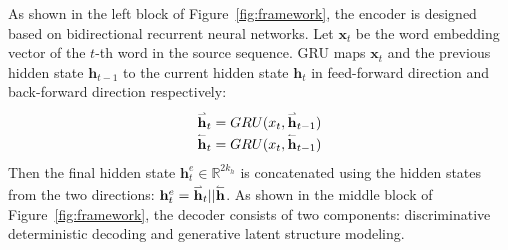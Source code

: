 \documentclass[11pt,letterpaper]{article}
\begin{document}
As shown in the left block of Figure~\ref{fig:framework}, the encoder is designed based on bidirectional recurrent neural networks.
Let $\mathbf{x}_t$ be the word embedding vector of the $t$-th word in the source sequence.
GRU maps $\mathbf{x}_t$ and the previous hidden state $\mathbf{h}_{t-1}$ to the current hidden state $\mathbf{h}_t$ in feed-forward direction and back-forward direction respectively:
\begin{equation}
\begin{array}{l}
{{\mathord{\buildrel{\lower3pt\hbox{$\scriptscriptstyle\rightharpoonup$}} 
			\over {\mathbf{h}}} }_t} = GRU({x_t},{{\mathord{\buildrel{\lower3pt\hbox{$\scriptscriptstyle\rightharpoonup$}} 
			\over {\mathbf{h}}} }_{t - 1}})\\
{{\mathord{\buildrel{\lower3pt\hbox{$\scriptscriptstyle\leftharpoonup$}} 
			\over {\mathbf{h}}} }_t} = GRU({x_t},{{\mathord{\buildrel{\lower3pt\hbox{$\scriptscriptstyle\leftharpoonup$}} 
			\over {\mathbf{h}}} }_{t - 1}})
\end{array}
\end{equation}
Then the final hidden state $\mathbf{h}_t^e \in \mathbb{R}^{2k_h}$ is concatenated using the hidden states from the two directions:
$
{\mathbf{h}}_t^e = {{\mathord{\buildrel{\lower3pt\hbox{$\scriptscriptstyle\rightharpoonup$}} 
			\over {\mathbf{h}}} }_t}||\mathord{\buildrel{\lower3pt\hbox{$\scriptscriptstyle\leftharpoonup$}} 
	\over {\mathbf{h}}} 
$. 
As shown in the middle block of Figure~\ref{fig:framework}, the decoder consists of two components: discriminative deterministic decoding  and generative latent structure modeling.
\end{document}
